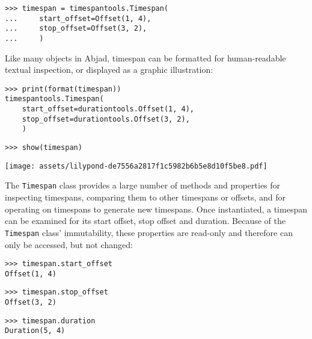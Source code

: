 \begin{abjadbookoutput}
\begin{singlespacing}
\vspace{-0.5\baselineskip}
\begin{verbatim}
>>> timespan = timespantools.Timespan(
...     start_offset=Offset(1, 4),
...     stop_offset=Offset(3, 2),
...     )
\end{verbatim}
\end{singlespacing}
\end{abjadbookoutput}

\noindent Like many objects in Abjad, timespan can be formatted for
human-readable textual inspection, or displayed as a graphic illustration:

\begin{comment}
<abjad>
print(format(timespan))
show(timespan)
</abjad>
\end{comment}

\begin{abjadbookoutput}
\begin{singlespacing}
\vspace{-0.5\baselineskip}
\begin{verbatim}
>>> print(format(timespan))
timespantools.Timespan(
    start_offset=durationtools.Offset(1, 4),
    stop_offset=durationtools.Offset(3, 2),
    )
\end{verbatim}
\begin{verbatim}
>>> show(timespan)
\end{verbatim}
\noindent\texttt{[image: assets/lilypond-de7556a2817f1c5982b6b5e8d10f5be8.pdf]}
\end{singlespacing}
\end{abjadbookoutput}

\noindent The \texttt{Timespan} class provides a large number of methods and
properties for inspecting timespans, comparing them to other timespans or
offsets, and for operating on timespans to generate new timespans. Once
instantiated, a timespan can be examined for its start offset, stop offset
and duration. Because of the \texttt{Timespan} class' immutability, these
properties are read-only and therefore can only be accessed, but not changed:

\begin{comment}
<abjad>
timespan.start_offset
timespan.stop_offset
timespan.duration
</abjad>
\end{comment}

\begin{abjadbookoutput}
\begin{singlespacing}
\vspace{-0.5\baselineskip}
\begin{verbatim}
>>> timespan.start_offset
Offset(1, 4)
\end{verbatim}
\begin{verbatim}
>>> timespan.stop_offset
Offset(3, 2)
\end{verbatim}
\begin{verbatim}
>>> timespan.duration
Duration(5, 4)
\end{verbatim}
\end{singlespacing}
\end{abjadbookoutput}

